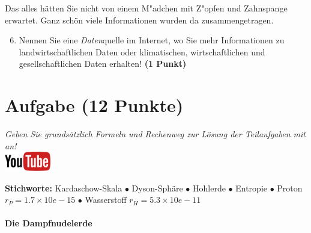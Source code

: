 \documentclass[a4paper, 9pt]{scrartcl}\usepackage[]{graphicx}\usepackage[]{xcolor}
\begin{document}
Das alles hätten Sie nicht von einem M{"a}dchen mit Z{"o}pfen und Zahnspange erwartet. Ganz schön viele Informationen wurden da zusammengetragen.

\begin{enumerate}
  \setcounter{enumi}{5}  
  \item Nennen Sie eine \textit{Daten}quelle im Internet, wo Sie mehr Informationen zu landwirtschaftlichen Daten oder klimatischen, wirtschaftlichen und gesellschaftlichen Daten erhalten! \textbf{(1 Punkt)}
\end{enumerate} 
\clearpage

\section{Aufgabe \hfill (12 Punkte)}

\textit{Geben Sie grunds{\"a}tzlich Formeln und Rechenweg zur L{\"o}sung der
  Teilaufgaben mit an!} \\[1Ex]

\hfill\href{https://youtu.be/WZSxntiNF8s}{\includegraphics[width = 2cm]{img/youtube}} %
\hspace{2Ex}

{\tiny\textbf{Stichworte:} Kardaschow-Skala $\bullet$ Dyson-Sphäre $\bullet$ Hohlerde $\bullet$ Entropie $\bullet$ Proton $r_P = 1.7 \times 10e-15$ $\bullet$ Wasserstoff $r_H = 5.3\times 10e-11$}

\paragraph{Die Dampfnudelerde}
\end{document}
